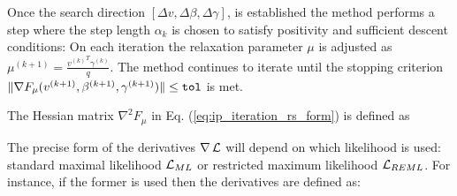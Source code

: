 \documentclass[11pt,letterpaper]{article}
\numberwithin{equation}{section} %
\numberwithin{figure}{section} %
\numberwithin{table}{section} %
\begin{document}
Once the search direction $[\Delta v, \Delta \beta, \Delta \gamma]$, is established the method performs a step
where the step length $\alpha_k$ is chosen to satisfy positivity and sufficient descent conditions:
On each iteration the relaxation parameter $\mu$ is adjusted as $\mu^{(k+1)} = \frac{{v^{(k)}}^T\gamma^{(k)}}{q}$. The method continues to iterate until the stopping criterion $\|\nabla F_\mu(v^{(k+1)}, \beta^{(k+1)}, \gamma^{(k+1)})\| \leq \text{\texttt{tol}}$ is met. 

The Hessian matrix $\nabla^2 F_\mu$ in Eq. (\ref{eq:ip_iteration_rs_form}) is defined as 

The precise form of the derivatives $\nabla\operatorname{\mathcal{L}}$ will depend on which likelihood is used: standard maximal likelihood $\operatorname{\mathcal{L}}_{ML}$ or restricted maximum likelihood $\operatorname{\mathcal{L}}_{REML}$. For instance, if the former is used then the derivatives are defined as: 
\end{document}
